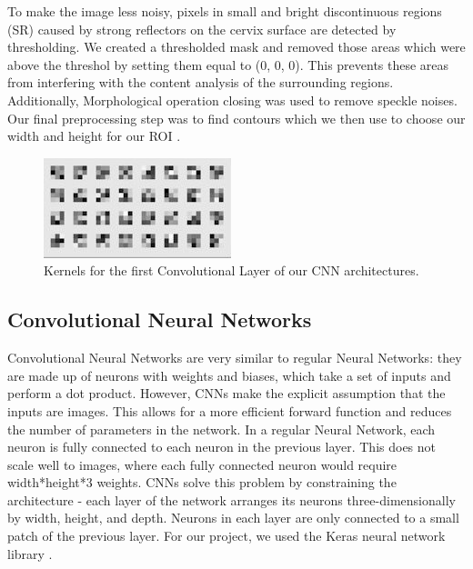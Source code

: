 \documentclass{article}
\begin{document}
To make the image less noisy, pixels in small and bright discontinuous regions (SR) caused by strong reflectors on the cervix surface are detected by thresholding. We created a thresholded mask and removed those areas which were above the threshol by setting them equal to (0, 0, 0). This prevents these areas from interfering with the content analysis of the surrounding regions. Additionally, Morphological operation closing was used to remove speckle noises. Our final preprocessing step was to find contours which we then use to choose our width and height for our ROI \cite{autodetect}.

\begin{figure}[ht]
  \vskip 0.2in
  \begin{center}
  \centerline{\includegraphics[width=\columnwidth]{firstconvlayer}}
  \caption {Kernels for the first Convolutional Layer of our CNN architectures.}
  \label{kernels}
  \end{center}
  \vskip -0.2in
\end{figure}

\subsection{Convolutional Neural Networks}
Convolutional Neural Networks are very similar to regular Neural Networks: they are made up of neurons with weights and biases, which take a set of inputs and perform a dot product. However, CNNs make the explicit assumption that the inputs are images. This allows for a more efficient forward function and reduces the number of parameters in the network. In a regular Neural Network, each neuron is fully connected to each neuron in the previous layer. This does not scale well to images, where each fully connected neuron would require width*height*3 weights. CNNs solve this problem by constraining the architecture - each layer of the network arranges its neurons three-dimensionally by width, height, and depth. Neurons in each layer are only connected to a small patch of the previous layer. For our project, we used the Keras neural network library \cite{cs231n}.
\end{document}
